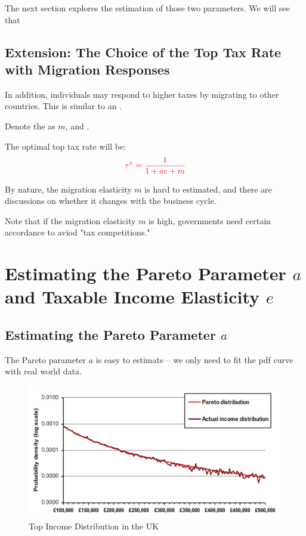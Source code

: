             The next section explores the estimation of those two parameters. We will see that 

        \subsection{Extension: The Choice of the Top Tax Rate with Migration Responses}

            In addition, individuals may respond to higher taxes by migrating to other countries. This is similar to an .

            Denote the  as $m$, and .

            The optimal top tax rate will be:
            \begin{equation}
                \color{red}
                    \tau^* = \frac{1}{1+ae+m}
            \end{equation}

            By nature, the migration elasticity $m$ is hard to estimated, and there are discussions on whether it changes with the business cycle.

            Note that if the migration elasticity $m$ is high, governments need certain accordance to aviod "tax competitions."


    \section{Estimating the Pareto Parameter $a$ and Taxable Income Elasticity $e$}

        \subsection{Estimating the Pareto Parameter $a$}

            The Pareto parameter $a$ is easy to estimate -- we only need to fit the pdf curve with real world data.

            \begin{figure}[H]
                \centering
                \includegraphics[width=4.5in]{images/ch13/13_UK_Pareto_para.png}
                \caption{Top Income Distribution in the UK}
            \end{figure}

